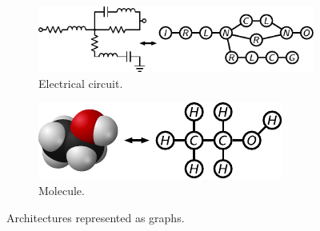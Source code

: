 \begin{figure}
\begin{subfigure}[b]{0.6\textwidth}
\centering
\includegraphics[scale=1]{../ch2/figures/circuit}
\caption{Electrical circuit.\label{fig:ch2:initialexamples4}}
\end{subfigure}%
\begin{subfigure}[b]{0.4\textwidth}
\centering
\includegraphics[scale=1]{../ch2/figures/molecule2}
\caption{Molecule.\label{fig:ch2:initialexamples5}}
\end{subfigure}

\caption{Architectures represented as graphs.\label{fig:ch2:initialexamples}}

\end{figure}